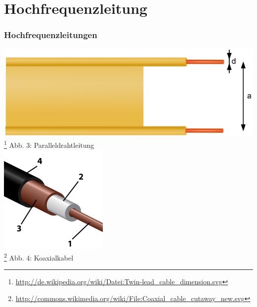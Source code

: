 \section*{Hochfrequenzleitung}
\begin{frame}
\frametitle{Hochfrequenzleitungen}
\begin{center}
\includegraphics[scale=0.25]{e10/parallel.png}\\
\footnote{\url{http://de.wikipedia.org/wiki/Datei:Twin-lead_cable_dimension.svg}}
Abb. 3: Paralleldrahtleitung
\\
\includegraphics[scale=0.4]{e10/coax.png}\\
\footnote{\url{http://commons.wikimedia.org/wiki/File:Coaxial_cable_cutaway_new.svg}}
Abb. 4: Koaxialkabel
\end{center}
\end{frame}

